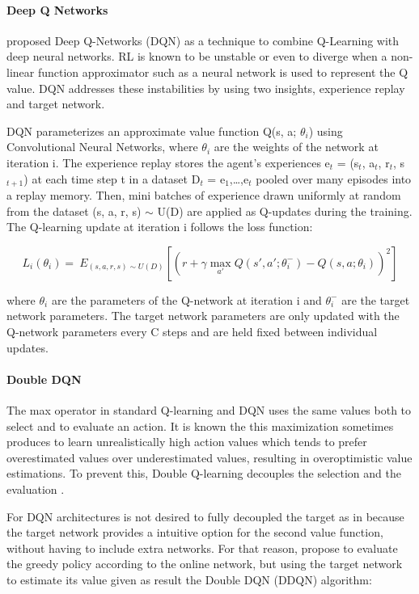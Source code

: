 \documentclass{llncs}
\begin{document}
\paragraph{\textbf{Deep Q Networks}}

\cite{Mnih2015} proposed Deep Q-Networks (DQN) as a technique to combine Q-Learning with deep neural networks. RL is known to be unstable or even to diverge when a non-linear function approximator such as a neural network is used to represent the Q value. DQN addresses these instabilities by using two insights, experience replay and target network.
	
	DQN parameterizes an approximate value function Q(s, a; $\theta_{i}$) using Convolutional Neural Networks, where $\theta_{i}$ are the weights of the network at iteration i. The experience replay stores the agent's experiences e$_{t}$ = (s$_{t}$, a$_{t}$, r$_{t}$, s$_{t+1}$) at each time step t in a dataset D$_{t}$ = {e$_{1}$,…,e$_{t}$} pooled over many episodes into a replay memory. Then, mini batches of experience drawn uniformly at random from the dataset (s, a, r, s) $\sim$ U(D) are applied as Q-updates during the training. The Q-learning update at iteration i follows the loss function:
	
\begin{equation}
L_{i}(\theta_{i}) = \ E_{(s,a,r,s) \sim U(D)} \left[ \left(r + \gamma \max_{a'}Q\left(s',a';\theta_{i}^{-}\right) - Q\left(s,a;\theta_{i}\right)\right)^{2} \right]
\end{equation}

where $\theta_{i}$ are the parameters of the Q-network at iteration i and $\theta_{i}^{-}$ are the target network parameters. The target network parameters are only updated with the Q-network parameters every C steps and are held fixed between individual updates.

\paragraph{\textbf{Double DQN}}

	The max operator in standard Q-learning and DQN uses the same values both to select and to evaluate an action. It is known the this maximization sometimes produces to learn unrealistically high action values which tends to prefer overestimated values over underestimated values, resulting in overoptimistic value estimations. To prevent this, Double Q-learning decouples the selection and the evaluation \cite{Hasselt2010}.
	
	For DQN architectures is not desired to fully decoupled the target  as in \cite{Hasselt2010} because the target network provides a intuitive option for the second value function, without having to include extra networks. For that reason, \cite{Hasselt:2016:DRL:3016100.3016191} propose to evaluate the greedy policy according to the online network, but using the target network to estimate its value given as result the Double DQN (DDQN) algorithm:
	
\end{document}
